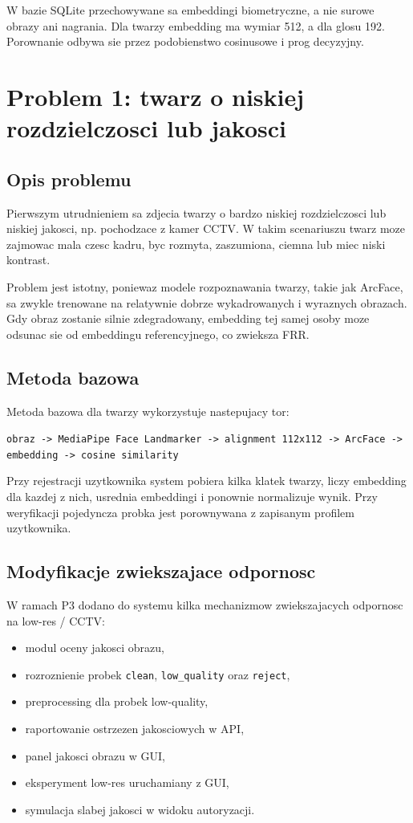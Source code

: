 \documentclass[12pt]{article}
\begin{document}
W bazie SQLite przechowywane sa embeddingi biometryczne, a nie surowe obrazy ani nagrania. Dla twarzy embedding ma wymiar 512, a dla glosu 192. Porownanie odbywa sie przez podobienstwo cosinusowe i prog decyzyjny.

\section{Problem 1: twarz o niskiej rozdzielczosci lub jakosci}

\subsection{Opis problemu}

Pierwszym utrudnieniem sa zdjecia twarzy o bardzo niskiej rozdzielczosci lub niskiej jakosci, np. pochodzace z kamer CCTV. W takim scenariuszu twarz moze zajmowac mala czesc kadru, byc rozmyta, zaszumiona, ciemna lub miec niski kontrast.

Problem jest istotny, poniewaz modele rozpoznawania twarzy, takie jak ArcFace, sa zwykle trenowane na relatywnie dobrze wykadrowanych i wyraznych obrazach. Gdy obraz zostanie silnie zdegradowany, embedding tej samej osoby moze odsunac sie od embeddingu referencyjnego, co zwieksza FRR.

\subsection{Metoda bazowa}

Metoda bazowa dla twarzy wykorzystuje nastepujacy tor:

\begin{center}
\texttt{obraz -> MediaPipe Face Landmarker -> alignment 112x112 -> ArcFace -> embedding -> cosine similarity}
\end{center}

Przy rejestracji uzytkownika system pobiera kilka klatek twarzy, liczy embedding dla kazdej z nich, usrednia embeddingi i ponownie normalizuje wynik. Przy weryfikacji pojedyncza probka jest porownywana z zapisanym profilem uzytkownika.

\subsection{Modyfikacje zwiekszajace odpornosc}

W ramach P3 dodano do systemu kilka mechanizmow zwiekszajacych odpornosc na low-res / CCTV:

\begin{itemize}
    \item modul oceny jakosci obrazu,
    \item rozroznienie probek \texttt{clean}, \texttt{low\_quality} oraz \texttt{reject},
    \item preprocessing dla probek low-quality,
    \item raportowanie ostrzezen jakosciowych w API,
    \item panel jakosci obrazu w GUI,
    \item eksperyment low-res uruchamiany z GUI,
    \item symulacja slabej jakosci w widoku autoryzacji.
\end{itemize}
\end{document}
